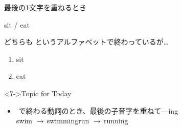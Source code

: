 \documentclass[aspectratio=169,xcolor={dvipsnames,table}]{beamer}
\begin{document}
\begin{frame}[plain]{最後の1文字を重ねるとき}
  \Large

  sit / eat

  どちらも\,\,というアルファベットで終わっているが\ldots

  \bigskip

  \begin{enumerate}
    \item<2-> sit \,\,\,\,\,\,\,\,\,\,\,\,
    \item<2-> eat \,\,\,\,\,\,\,\,\,\,\,\hfill{}
  \end{enumerate}

  \bigskip
  \begin{block}<7->{Topic for Today}\small
    \begin{itemize}[square]
      \item {}\,\,で終わる動詞のとき、最後の子音字を重ねて---ing\,\,\dbend\,\,\dbend\\[5pt]
            \hfill{swim $\rightarrow$\,swimming\hspace{15pt}run $\rightarrow$\,running}
    \end{itemize}
  \end{block}
\end{frame}
\end{document}
